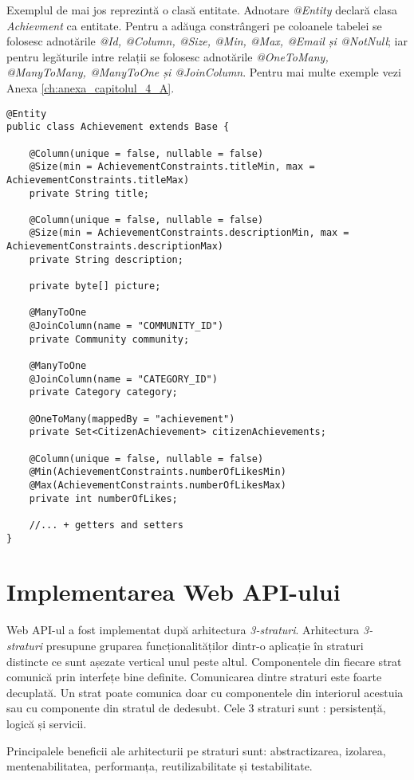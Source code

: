 	Exemplul de mai jos reprezintă o clasă entitate. Adnotare \textit{@Entity} declară clasa \textit{Achievment} ca entitate.
Pentru a adăuga constrângeri pe coloanele tabelei se folosesc adnotările \textit{@Id, @Column, @Size, @Min, @Max, @Email și @NotNull}; 
iar pentru legăturile intre relații se folosesc adnotările \textit{@OneToMany, @ManyToMany, @ManyToOne și @JoinColumn}. Pentru 
mai multe exemple vezi Anexa \ref{ch:anexa_capitolul_4_A}.
\lstset{language=Java}
\begin {lstlisting}
@Entity
public class Achievement extends Base {

	@Column(unique = false, nullable = false)
	@Size(min = AchievementConstraints.titleMin, max = AchievementConstraints.titleMax)
	private String title;

	@Column(unique = false, nullable = false)
	@Size(min = AchievementConstraints.descriptionMin, max = AchievementConstraints.descriptionMax)
	private String description;

	private byte[] picture;

	@ManyToOne
	@JoinColumn(name = "COMMUNITY_ID")
	private Community community;

	@ManyToOne
	@JoinColumn(name = "CATEGORY_ID")
	private Category category;

	@OneToMany(mappedBy = "achievement")
	private Set<CitizenAchievement> citizenAchievements;
	
	@Column(unique = false, nullable = false)
	@Min(AchievementConstraints.numberOfLikesMin)
	@Max(AchievementConstraints.numberOfLikesMax)
	private int numberOfLikes;
	
	//... + getters and setters 
}
\end{lstlisting}

\section{Implementarea Web API-ului}
Web API-ul a fost implementat după arhitectura \textit{3-straturi}. Arhitectura \textit{3-straturi} 
presupune gruparea funcționalităților dintr-o aplicație în 
straturi distincte ce sunt așezate vertical unul peste altul.
Componentele din fiecare strat comunică prin interfețe bine definite.
Comunicarea dintre straturi este foarte decuplată. Un strat poate 
comunica doar cu componentele din interiorul acestuia sau cu 
componente din stratul de dedesubt. Cele 3 straturi sunt : persistență, logică și servicii.

Principalele beneficii ale arhitecturii pe straturi sunt: abstractizarea, izolarea, 
mentenabilitatea, performanța, reutilizabilitate și testabilitate.

